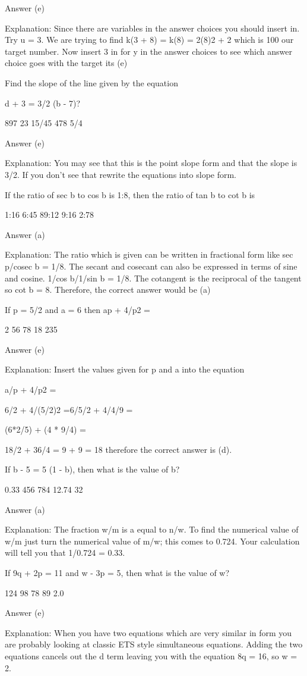     Answer (e)

    Explanation: Since there are variables in the answer choices you should insert in. Try u = 3. We are trying to find k(3 + 8) = k(8) = 2(8)2 + 2 which is 100 our target number. Now insert 3 in for y in the answer choices to see which answer choice goes with the target its (e)

    Find the slope of the line given by the equation

    d + 3 = 3/2 (b - 7)?

        897
        23
        15/45
        478
        5/4 

    Answer (e)

    Explanation: You may see that this is the point slope form and that the slope is 3/2. If you don't see that rewrite the equations into slope form.

    If the ratio of sec b to cos b is 1:8, then the ratio of tan b to cot b is

        1:16
        6:45
        89:12
        9:16
        2:78 

    Answer (a)

    Explanation: The ratio which is given can be written in fractional form like sec p/cosec b = 1/8. The secant and cosecant can also be expressed in terms of sine and cosine. 1/cos b/1/sin b = 1/8. The cotangent is the reciprocal of the tangent so cot b = 8. Therefore, the correct answer would be (a)

    If p = 5/2 and a = 6 then ap + 4/p2 =

        2
        56
        78
        18
        235 

    Answer (e)

    Explanation: Insert the values given for p and a into the equation

    a/p + 4/p2 =

    6/2 + 4/(5/2)2 =6/5/2 + 4/4/9 =

    (6*2/5) + (4 * 9/4) =

    18/2 + 36/4 = 9 + 9 = 18 therefore the correct answer is (d).

    If b - 5 = 5 (1 - b), then what is the value of b?

        0.33
        456
        784
        12.74
        32 

    Answer (a)

    Explanation: The fraction w/m is a equal to n/w. To find the numerical value of w/m just turn the numerical value of m/w; this comes to 0.724. Your calculation will tell you that 1/0.724 = 0.33.

    If 9q + 2p = 11 and w - 3p = 5, then what is the value of w?

        124
        98
        78
        89
        2.0 

    Answer (e)

    Explanation: When you have two equations which are very similar in form you are probably looking at classic ETS style simultaneous equations. Adding the two equations cancels out the d term leaving you with the equation 8q = 16, so w = 2. 





